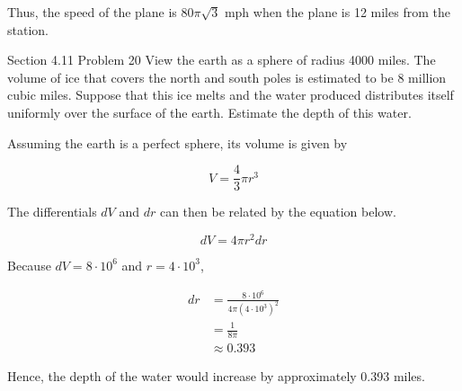 \documentclass{article}
\begin{document}
    Thus, the speed of the plane is $80\pi\sqrt{3}$ mph when the plane is 12 miles from the station.

    \begin{tbhtheorem}{Section 4.11 Problem 20}
        View the earth as a sphere of radius 4000 miles. The volume of ice that covers the north and south poles is estimated to be 8 million cubic miles. Suppose that this ice melts and the water produced distributes
        itself uniformly over the surface of the earth. Estimate the depth of this water.
    \end{tbhtheorem}

    Assuming the earth is a perfect sphere, its volume is given by

    \[
        V = \frac{4}{3}\pi r^3
    \]

    The differentials $dV$ and $dr$ can then be related by the equation below.

    \[
        dV = 4\pi r^2 dr
    \]

    Because $dV = 8 \cdot 10^6$ and $r=4\cdot 10^3$,

    \begin{align*}
        dr  &= \frac{8\cdot 10^6}{4\pi (4\cdot 10^3)^2} \\
            &= \frac{1}{8\pi} \\
        &\approx 0.393
    \end{align*}

    Hence, the depth of the water would increase by approximately 0.393 miles.
\end{document}
